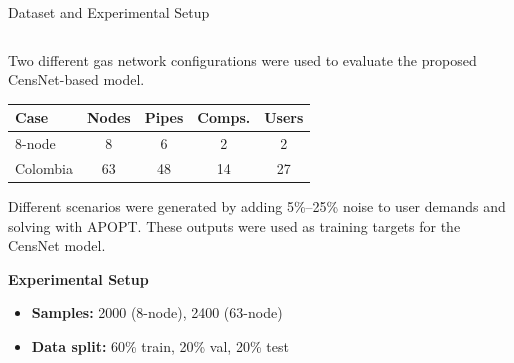 \documentclass[hyperref={colorlinks,citecolor=blue,linkcolor=blue,urlcolor=blue}]{beamer}
\begin{document}
\begin{frame}{Dataset and Experimental Setup}
\justifying
\scriptsize
\begin{columns}[t,onlytextwidth]
    \begin{column}{0.55\textwidth}
        Two different gas network configurations were used to evaluate the proposed CensNet-based model.

        \vspace{0.3em}
        \begin{table}[H]
            \centering
            \setlength{\tabcolsep}{4pt}
            \renewcommand{\arraystretch}{1.1}
            \begin{tabular}{lcccc}
                \toprule
                \textbf{Case} & \textbf{Nodes} & \textbf{Pipes} & \textbf{Comps.} & \textbf{Users} \\
                \midrule
                8-node & 8  & 6  & 2  & 2  \\
                Colombia & 63 & 48 & 14 & 27 \\
                \bottomrule
            \end{tabular}
        \end{table}

        \vspace{0.5em}
        Different scenarios were generated by adding 5\%–25\% noise to user demands and solving with APOPT.
        These outputs were used as training targets for the CensNet model.
        
         \vspace{1em}

        \textbf{Experimental Setup}
        \begin{itemize}
            \item \textbf{Samples:} 2000 (8-node), 2400 (63-node)
            \item \textbf{Data split:} 60\% train, 20\% val, 20\% test  
        \end{itemize}
    \end{column}


\end{columns}
\end{frame}
\end{document}

